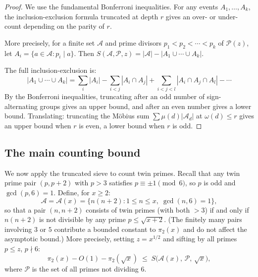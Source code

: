 \documentclass[12pt,a4paper]{amsart}
\theoremstyle{definition}
\begin{document}
\begin{proof}
  We use the fundamental Bonferroni inequalities.  For any events $A_1, \ldots, A_k$,
  the inclusion-exclusion formula truncated at depth $r$ gives an over- or
  under-count depending on the parity of $r$.

  More precisely, for a finite set $\mathcal{A}$ and prime divisors $p_1 < p_2 < \cdots < p_k$
  of $\mathcal{P}(z)$, let $A_i = \{a \in \mathcal{A} : p_i \mid a\}$.  Then
  $S(\mathcal{A}, \mathcal{P}, z) = |\mathcal{A}| - |A_1 \cup \cdots \cup A_k|$.

  The full inclusion-exclusion is:
  \[
    |A_1 \cup \cdots \cup A_k|
    = \sum_i |A_i| - \sum_{i<j} |A_i \cap A_j| + \sum_{i<j<l} |A_i \cap A_j \cap A_l| - \cdots
  \]
  By the Bonferroni inequalities, truncating after an odd number of sign-alternating
  groups gives an upper bound, and after an even number gives a lower bound.
  Translating: truncating the M\"obius sum $\sum \mu(d) |\mathcal{A}_d|$ at
  $\omega(d) \leq r$ gives an upper bound when $r$ is even, a lower bound when
  $r$ is odd.
\end{proof}

\subsection{The main counting bound}

We now apply the truncated sieve to count twin primes.  Recall that any twin
prime pair $(p, p+2)$ with $p > 3$ satisfies $p \equiv \pm 1 \pmod 6$, so
$p$ is odd and $\gcd(p, 6) = 1$.  Define, for $x \geq 2$:
\[
  \mathcal{A} = \mathcal{A}(x)
  = \bigl\{n(n+2) : 1 \leq n \leq x,\; \gcd(n, 6) = 1\bigr\},
\]
so that a pair $(n, n+2)$ consists of twin primes (with both $> 3$) if and only
if $n(n+2)$ is not divisible by any prime $p \leq \sqrt{x+2}$.
(The finitely many pairs involving $3$ or $5$ contribute a bounded constant to
$\pi_2(x)$ and do not affect the asymptotic bound.)  More precisely, setting
$z = x^{1/2}$ and sifting by all primes $p \leq z$, $p \nmid 6$:
\[
  \pi_2(x) - O(1) - \pi_2(\sqrt{x})
  \;\leq\;
  S\!\bigl(\mathcal{A}(x),\, \mathcal{P},\, \sqrt{x}\bigr),
\]
where $\mathcal{P}$ is the set of all primes not dividing $6$.
\end{document}
